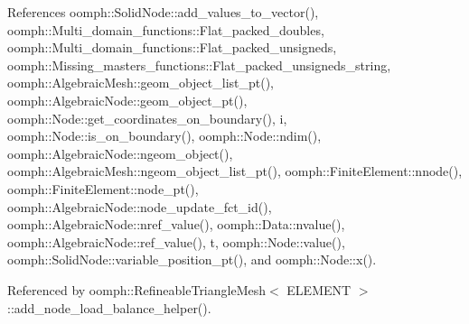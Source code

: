 References oomph\+::\+Solid\+Node\+::add\+\_\+values\+\_\+to\+\_\+vector(), oomph\+::\+Multi\+\_\+domain\+\_\+functions\+::\+Flat\+\_\+packed\+\_\+doubles, oomph\+::\+Multi\+\_\+domain\+\_\+functions\+::\+Flat\+\_\+packed\+\_\+unsigneds, oomph\+::\+Missing\+\_\+masters\+\_\+functions\+::\+Flat\+\_\+packed\+\_\+unsigneds\+\_\+string, oomph\+::\+Algebraic\+Mesh\+::geom\+\_\+object\+\_\+list\+\_\+pt(), oomph\+::\+Algebraic\+Node\+::geom\+\_\+object\+\_\+pt(), oomph\+::\+Node\+::get\+\_\+coordinates\+\_\+on\+\_\+boundary(), i, oomph\+::\+Node\+::is\+\_\+on\+\_\+boundary(), oomph\+::\+Node\+::ndim(), oomph\+::\+Algebraic\+Node\+::ngeom\+\_\+object(), oomph\+::\+Algebraic\+Mesh\+::ngeom\+\_\+object\+\_\+list\+\_\+pt(), oomph\+::\+Finite\+Element\+::nnode(), oomph\+::\+Finite\+Element\+::node\+\_\+pt(), oomph\+::\+Algebraic\+Node\+::node\+\_\+update\+\_\+fct\+\_\+id(), oomph\+::\+Algebraic\+Node\+::nref\+\_\+value(), oomph\+::\+Data\+::nvalue(), oomph\+::\+Algebraic\+Node\+::ref\+\_\+value(), t, oomph\+::\+Node\+::value(), oomph\+::\+Solid\+Node\+::variable\+\_\+position\+\_\+pt(), and oomph\+::\+Node\+::x().



Referenced by oomph\+::\+Refineable\+Triangle\+Mesh$<$ E\+L\+E\+M\+E\+N\+T $>$\+::add\+\_\+node\+\_\+load\+\_\+balance\+\_\+helper().

\mbox{\label{classoomph_1_1RefineableTriangleMesh_a51a28f4e7fccb020234c055bb42b8ef5}} 
